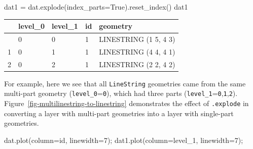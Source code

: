 \documentclass[
  letterpaper,
]{krantz}
\newenvironment{Shaded}{\begin{snugshade}}{\end{snugshade}}
\newcommand{\DecValTok}[1]{\textcolor[rgb]{0.68,0.00,0.00}{#1}}
\newcommand{\NormalTok}[1]{\textcolor[rgb]{0.00,0.23,0.31}{#1}}
\newcommand{\OperatorTok}[1]{\textcolor[rgb]{0.37,0.37,0.37}{#1}}
\newcommand{\StringTok}[1]{\textcolor[rgb]{0.13,0.47,0.30}{#1}}
\newcommand{\VariableTok}[1]{\textcolor[rgb]{0.07,0.07,0.07}{#1}}
\begin{document}
\begin{Shaded}
\begin{Highlighting}[]
\NormalTok{dat1 }\OperatorTok{=}\NormalTok{ dat.explode(index\_parts}\OperatorTok{=}\VariableTok{True}\NormalTok{).reset\_index()}
\NormalTok{dat1}
\end{Highlighting}
\end{Shaded}

\begin{longtable}[]{@{}lllll@{}}
\toprule\noalign{}
& level\_0 & level\_1 & id & geometry \\
\midrule\noalign{}
\endhead
\bottomrule\noalign{}
\endlastfoot
0 & 0 & 0 & 1 & LINESTRING (1 5, 4 3) \\
1 & 0 & 1 & 1 & LINESTRING (4 4, 4 1) \\
2 & 0 & 2 & 1 & LINESTRING (2 2, 4 2) \\
\end{longtable}

For example, here we see that all
\texttt{\textquotesingle{}LineString\textquotesingle{}} geometries came
from the same multi-part geometry (\texttt{level\_0}=\texttt{0}), which
had three parts (\texttt{level\_1}=\texttt{0},\texttt{1},\texttt{2}).
Figure~\ref{fig-multilinestring-to-linestring} demonstrates the effect
of \texttt{.explode} in converting a layer with multi-part geometries
into a layer with single-part geometries.

\begin{Shaded}
\begin{Highlighting}[]
\NormalTok{dat.plot(column}\OperatorTok{=}\StringTok{\textquotesingle{}id\textquotesingle{}}\NormalTok{, linewidth}\OperatorTok{=}\DecValTok{7}\NormalTok{)}\OperatorTok{;}
\NormalTok{dat1.plot(column}\OperatorTok{=}\StringTok{\textquotesingle{}level\_1\textquotesingle{}}\NormalTok{, linewidth}\OperatorTok{=}\DecValTok{7}\NormalTok{)}\OperatorTok{;}
\end{Highlighting}
\end{Shaded}
\end{document}
